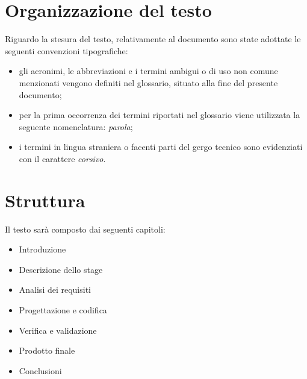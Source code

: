 \section{Organizzazione del testo}
Riguardo la stesura del testo, relativamente al documento sono state adottate le seguenti convenzioni tipografiche:
\begin{itemize}
	\item gli acronimi, le abbreviazioni e i termini ambigui o di uso non comune menzionati vengono definiti nel glossario, situato alla fine del presente documento;
	\item per la prima occorrenza dei termini riportati nel glossario viene utilizzata la seguente nomenclatura: \emph{parola}\glsfirstoccur ;
	\item i termini in lingua straniera o facenti parti del gergo tecnico sono evidenziati con il carattere \emph{corsivo}.
\end{itemize}

\section{Struttura}
Il testo sarà composto dai seguenti capitoli:
\begin{itemize}
\item Introduzione
\item Descrizione dello stage
\item Analisi dei requisiti
\item Progettazione e codifica
\item Verifica e validazione
\item Prodotto finale
\item Conclusioni
\end{itemize}